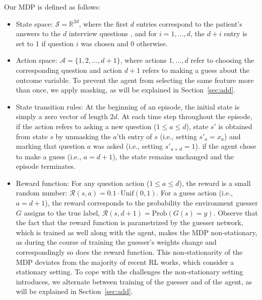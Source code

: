 \documentclass[reqno,11pt]{article}
\begin{document}
Our MDP is defined as follows:
\begin{itemize}
\item State space: $\mathcal{S} = \mathbb{R}^{2d}$, where the first $d$ entries correspond to the patient's answers to the $d$ interview questions , and for $i=1,\ldots, d$, the $d+ i$ entry is set to 1 if question $i$ was chosen and 0 otherwise.
\item Action space:  $\mathcal{A} = \{1, 2,\ldots, d+1 \}$, where actions $1,\ldots,d$ refer to choosing the corresponding question and action $d+1$ refers to making a guess about the outcome variable.  
To prevent the agent from selecting the same feature more than once, we apply masking, as will be explained in Section~\ref{sec:add}.
\item State transition rules:
At the beginning of an episode, the initial state is simply a zero vector of length $2d$.
At each time step throughout the episode, if the action refers to asking  a new question ($1 \le a \le d$), state $s'$ is obtained from state $s$ by unmasking the $a$'th entry of $s$  (i.e., setting $s'_a = x_a$) and marking that question $a$ was asked (i.e., setting $s'_{a+d} = 1$).
if the agent chose to make a guess (i.e., $a=d+1$), the state remains unchanged and the episode terminates.
\item Reward function: For any question action  ($1 \le a \le d$), the reward is a small random number: $\mathcal{R}(s, a) = 0.1 \cdot \mbox{Unif}(0,1)$. 
For a guess action (i.e., $a = d+1$), the reward corresponds to the probability the environment guesser $G$ assigns to the true label,  $\mathcal{R}(s, d+1) = \mbox{Prob}(G(s) = y)$.
Observe that the fact that the reward function is parametrized by the guesser network, which is trained as well along with the agent, makes the MDP non-stationary, as during the course of training the guesser's weights change and correspondingly so does the reward function. 
This non-stationarity of the MDP deviates from the majority of recent RL works, which consider a stationary setting. 
To cope with the challenges the non-stationary setting introduces, we alternate between training of the guesser and of the agent, as will be explained in Section~\ref{sec:add}.
 
\end{itemize}
\end{document}
